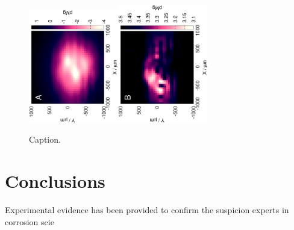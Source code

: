 \documentclass[3p]{elsarticle}
\begin{document}
\def\s{0.35}
\begin{figure}
\centering
\includegraphics[trim = 10mm 20mm 0mm 10mm, clip, width=\s\textwidth, angle=-90]{17012501.eps}\includegraphics[trim = 10mm 20mm 0mm 10mm, clip, width=\s\textwidth, angle=-90]{17012503_deconvoluted.eps}
\caption{Caption.}
\label{fig:2d}
\end{figure}





\section{Conclusions}

Experimental evidence has been provided to confirm the suspicion experts in corrosion scie
\end{document}
